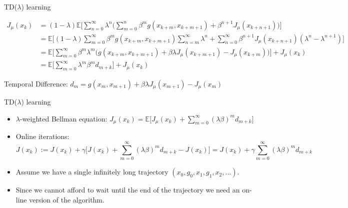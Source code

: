 \documentclass{beamer}
\def\E{{\mathbb E}}
\begin{document}
\begin{frame}{TD($\lambda$) learning}


\begin{align*}
J_\mu(x_k) &= (1-\lambda) \E\Big[ \sum\limits_{n=0}^\infty \lambda^n \Big( \sum\limits_{m=0}^{n} \beta^m g(x_{k+m}, x_{k+m+1})+\beta^{n+1} J_\mu (x_{k+n+1})\Big) \Big]\\
&=\E\Big[(1-\lambda) \sum\limits_{m=0}^{\infty} \beta^m g(x_{k+m}, x_{k+m+1})\sum\limits_{n=m}^\infty\lambda^n+\sum\limits_{n=0}^\infty\beta^{n+1} J_\mu (x_{k+n+1})(\lambda^n - \lambda^{n+1}) \Big]\\
&=\E\Big[\sum\limits_{m=0}^{\infty} \beta^{m}\lambda^{m}\Big( g(x_{k+m}, x_{k+m+1})+ \beta\lambda J_\mu (x_{k+m+1}) - J_\mu(x_{k+m})\Big) \Big]+J_\mu(x_k)\\
&=\E\Big[\sum\limits_{m=0}^{\infty} \lambda^{m}\beta^{m}d_{m+k}  \Big]+J_\mu(x_k)
\end{align*}

Temporal Difference:
$
d_m  = g(x_m, x_{m+1}) +\beta\lambda J_\mu({x_{m+1}}) - J_\mu(x_m)
$
\end{frame}







\begin{frame}{TD($\lambda$) learning}

\begin{itemize}
  \item $\lambda$-weighted Bellman equation: $
J_\mu(x_k) =\E\Big[J_\mu(x_k)+\sum\limits_{m=0}^{\infty} (\lambda\beta)^{m}d_{m+k}  \Big]
$

\item Online iterations:
$$
J(x_k) :=J(x_k) +\gamma\Big[J(x_k)+\sum\limits_{m=0}^{\infty} (\lambda\beta)^{m}d_{m+k} - J(x_k)\Big]=J(x_k) +\gamma\sum\limits_{m=0}^{\infty} (\lambda\beta)^{m}d_{m+k}
$$

\item Assume we have a single infinitely long trajectory $(x_0, g_0, x_1, g_1, x_2, ...)$. 

\item  Since we cannot afford to wait until the end of the trajectory we need an on-line version of the algorithm.

  
\end{itemize}

\end{frame}
\end{document}
